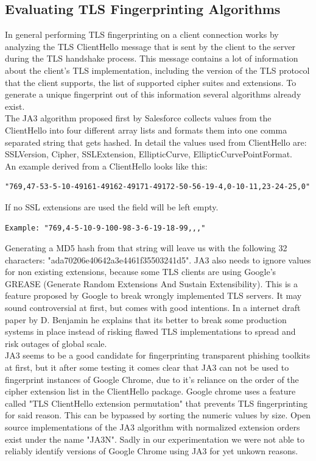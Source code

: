 \documentclass[12pt]{report}
\begin{document}
\subsection{Evaluating TLS Fingerprinting Algorithms}
In general performing TLS fingerprinting on a client connection works by analyzing the TLS ClientHello message that is sent by the client to the server during the TLS handshake process. This message contains a lot of information about the client's TLS implementation, including the version of the TLS protocol that the client supports, the list of supported cipher suites and extensions. To generate a unique fingerprint out of this information several algorithms already exist.\\The JA3 algorithm proposed first by Salesforce \cite{ja3Salesforce} collects values from the ClientHello into four different array lists and formats them into one comma separated string that gets hashed. In detail the values used from ClientHello are: SSLVersion, Cipher, SSLExtension, EllipticCurve, EllipticCurvePointFormat.\\An example derived from a ClientHello looks like this:
\begin{lstlisting}[breaklines=true]
"769,47-53-5-10-49161-49162-49171-49172-50-56-19-4,0-10-11,23-24-25,0"
\end{lstlisting}
If no SSL extensions are used the field will be left empty.
\begin{lstlisting}[breaklines=true]
Example: "769,4-5-10-9-100-98-3-6-19-18-99,,,"
\end{lstlisting}
Generating a MD5 hash from that string will leave us with the following 32 characters: "ada70206e40642a3e4461f35503241d5". JA3 also needs to ignore values for non existing extensions, because some TLS clients are using Google’s GREASE (Generate Random Extensions And Sustain Extensibility). This is a feature proposed by Google to break wrongly implemented TLS servers. It may sound controversial at first, but comes with good intentions. In a internet draft paper by D. Benjamin \cite{greaseDraft} he explains that its better to break some production systems in place instead of risking flawed TLS implementations to spread and risk outages of global scale.\\JA3 seems to be a good candidate for fingerprinting transparent phishing toolkits at first, but it after some testing it comes clear that JA3 can not be used to fingerprint instances of Google Chrome, due to it's reliance on the order of the cipher extension list in the ClientHello package. Google chrome uses a feature called "TLS ClientHello extension permutation" that prevents TLS fingerprinting for said reason. This can be bypassed by sorting the numeric values by size. Open source implementations of the JA3 algorithm with normalized extension orders exist under the name "JA3N". Sadly in our experimentation we were not able to reliably identify versions of Google Chrome using JA3 for yet unkown reasons.\\ \\
\end{document}
